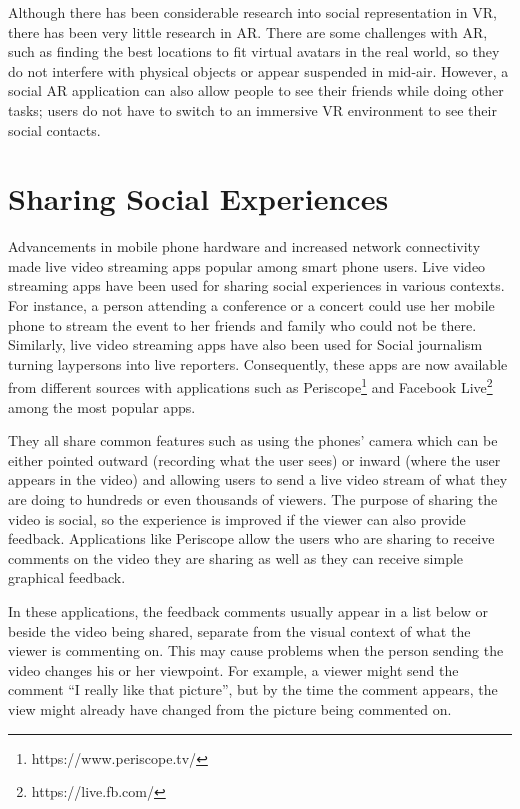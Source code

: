 Although there has been considerable research into social representation in VR, there has been very little research in AR. There are some challenges with AR, such as finding the best locations to fit virtual avatars in the real world, so they do not interfere with physical objects or appear suspended in mid-air. However, a social AR application can also allow people to see their friends while doing other tasks; users do not have to switch to an immersive VR environment to see their social contacts.

\section{Sharing Social Experiences}


Advancements in mobile phone hardware and increased network connectivity made live video streaming apps popular among smart phone users. Live video streaming apps have been used for sharing social experiences in various contexts. For instance, a person attending a conference or a concert could use her mobile phone to stream the event to her friends and family who could not be there. Similarly, live video streaming apps have also been used for Social journalism turning laypersons into live reporters. Consequently, these apps are now available from different sources with applications such as Periscope\footnote{https://www.periscope.tv/} and Facebook Live\footnote{https://live.fb.com/} among the most popular apps. 

They all share common features such as using the phones' camera which can be either pointed outward (recording what the user sees) or inward (where the user appears in the video) and allowing users to send a live video stream of what they are doing to hundreds or even thousands of viewers. The purpose of sharing the video is social, so the experience is improved if the viewer can also provide feedback. Applications like Periscope allow the users who are sharing to receive comments on the video they are sharing as well as they can receive simple graphical feedback. 

In these applications, the feedback comments usually appear in a list below or beside the video being shared, separate from the visual context of what the viewer is commenting on. This may cause problems when the person sending the video changes his or her viewpoint. For example, a viewer might send the comment “I really like that picture”, but by the time the comment appears, the view might already have changed from the picture being commented on.


